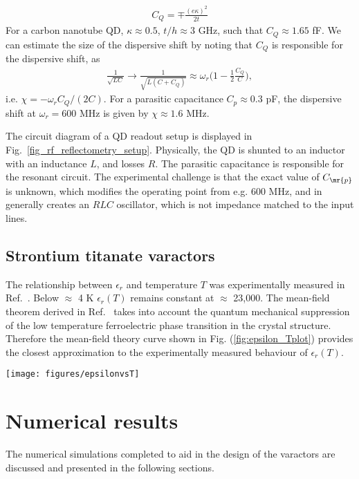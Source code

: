 \documentclass[10pt,a4paper,twoside]{article}
\begin{document}
\begin{multicols}{2}
\begin{align*}
C_Q = \mp \frac{(e \kappa)^2}{2 t}
\end{align*} 
For a carbon nanotube QD, $\kappa \approx 0.5$, $t/h \approx 3$ GHz, such that $C_Q \approx 1.65$ fF. 
We can estimate the size of the dispersive shift by noting that $C_Q$ is responsible for the dispersive shift, as
\begin{align*}
\frac{ 1 }{ \sqrt{LC} } \to \frac{ 1 }{ \sqrt{L(C + C_Q)} } \approx \omega_r \bigg(1 - \frac{1}{2} \frac{ C_Q }{ C } \bigg) ,
\end{align*}
i.e. $\chi = -\omega_r C_Q / (2 C)$. For a parasitic capacitance $C_p \approx 0.3$ pF, the dispersive shift at $\omega_r = 600$ MHz is given by $\chi \approx 1.6$ MHz.  
\par
The circuit diagram of a QD readout setup is displayed in Fig.~\ref{fig_rf_reflectometry_setup}. Physically, the QD is shunted to an inductor with an inductance $L$, and losses $R$. The parasitic capacitance is responsible for the resonant circuit. The experimental challenge is that the exact value of $C_{\mr{p}}$ is unknown, which modifies the operating point from e.g. $600$ MHz, and in generally creates an $RLC$ oscillator, which is not impedance matched to the input lines. 
\subsection{Strontium titanate varactors}
The relationship between $\epsilon_{r}$ and temperature $T$ was experimentally measured in Ref.~\cite{PhysRevB.19.3593}. Below $\approx$ 4 K $\epsilon_{r}(T)$ remains constant at $\approx$ 23,000. The mean-field theorem derived in Ref.~\cite{PhysRev.86.118} takes into account the quantum mechanical suppression of the low temperature ferroelectric phase transition in the crystal structure. Therefore the mean-field theory curve shown in Fig. (\ref{fig:epsilon_Tplot}) provides the closest approximation to the experimentally measured behaviour of $\epsilon_{r}(T)$. 
\begin{Figure}
\centering
\texttt{[image: figures/epsilonvsT]}
\end{Figure}
\section{\label{sec:Simulation}Numerical results}
The numerical simulations completed to aid in the design of the varactors are discussed and presented in the following sections. 

\end{multicols}
\end{document}
